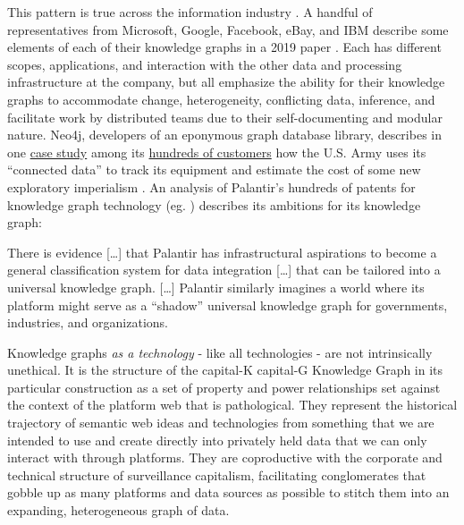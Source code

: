 This pattern is true across the information industry \cite{sequedaDesigningBuildingEnterprise2021} . A handful of
representatives from Microsoft, Google, Facebook, eBay, and IBM describe
some elements of each of their knowledge graphs in a 2019 paper \cite{noyIndustryscaleKnowledgeGraphs2019} . Each has different
scopes, applications, and interaction with the other data and processing
infrastructure at the company, but all emphasize the ability for their
knowledge graphs to accommodate change, heterogeneity, conflicting data,
inference, and facilitate work by distributed teams due to their
self-documenting and modular nature. Neo4j, developers of an eponymous
graph database library, describes in one
\href{https://neo4j.com/case-studies/us-army/}{case study} among its
\href{https://neo4j.com/customers/}{hundreds of customers} how the U.S.
Army uses its ``connected data'' to track its equipment and estimate the
cost of some new exploratory imperialism \cite{neo4jNeo4jArmyCase2021} . An analysis of Palantir's hundreds of
patents for knowledge graph technology (eg. \cite{cohenSystemMethodSharing2015, mathuraAutomatedDatabaseAnalysis2017, yousafSystemsMethodsUser2018, knudsonSystemsMethodsAnnotating2021} )
describes its ambitions for its knowledge graph:

\begin{leftbar}
There is evidence {[}\ldots{]} that Palantir has infrastructural
aspirations to become a general classification system for data
integration {[}\ldots{]} that can be tailored into a universal knowledge
graph. {[}\ldots{]} Palantir similarly imagines a world where its
platform might serve as a ``shadow'' universal knowledge graph for
governments, industries, and organizations. \cite{iliadisSeerSeenSurveying2022} 
\end{leftbar}

Knowledge graphs \emph{as a technology} - like all technologies - are
not intrinsically unethical. It is the structure of the capital-K
capital-G Knowledge Graph in its particular construction as a set of
property and power relationships set against the context of the platform
web that is pathological. They represent the historical trajectory of
semantic web ideas and technologies from something that we are intended
to use and create directly into privately held data that we can only
interact with through platforms. They are coproductive with the
corporate and technical structure of surveillance capitalism,
facilitating conglomerates that gobble up as many platforms and data
sources as possible to stitch them into an expanding, heterogeneous
graph of data.

